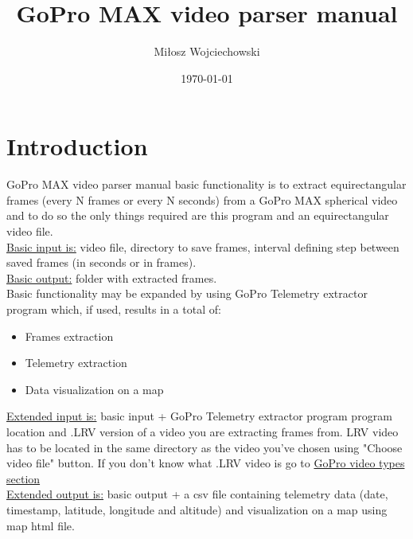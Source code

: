 \documentclass[a4paper,12pt]{book}
\begin{document}
\author{Miłosz Wojciechowski}
\title{GoPro MAX video parser manual}
\date{\today}


\maketitle
\pagebreak
{}
\renewcommand{\labelenumii}{\arabic{enumi}.\arabic{enumii}}
\tableofcontents
\chapter{Introduction}
GoPro MAX video parser manual basic functionality is to extract equirectangular frames (every N frames or every N seconds) from a GoPro MAX spherical video and to do so the only things required are this program and an equirectangular video file.\\

\underline{Basic input is:} video file, directory to save frames, interval defining step between saved frames (in seconds or in frames).\\

\underline{Basic output:} folder with extracted frames.\\

Basic functionality may be expanded by using GoPro Telemetry extractor program which, if used, results in a total of:
\begin{itemize}
	\item Frames extraction
	\item Telemetry extraction
	\item Data visualization on a map
\end{itemize}

\underline{Extended input is:} basic input + GoPro Telemetry extractor program program location and .LRV version of a video you are extracting frames from. LRV video has to be located in the same directory as the video you've chosen using "Choose video file" button. If you don't know what .LRV video is go to \hyperref[sec:video]{GoPro video types section}\\

\underline{Extended output is:} basic output + a csv file containing telemetry data (date, timestamp, latitude, longitude and altitude) and visualization on a map using map html file.
\end{document}
